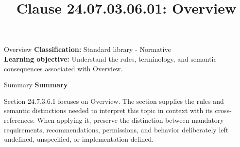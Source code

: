\documentclass[10pt,letterpaper]{article}
\title{Clause 24.07.03.06.01: Overview}
\author{}
\date{}
\begin{document}
\maketitle
\begin{CornellOverviewBox}{Overview}
\textbf{Classification:} Standard library - Normative\\[2pt]
\textbf{Learning objective:} Understand the rules, terminology, and semantic consequences associated with Overview.
\end{CornellOverviewBox}\begin{CornellSummaryBox}{Summary}
{\sffamily\bfseries\color{Accent} Summary}\par\vspace{3pt}Section 24.7.3.6.1 focuses on Overview. The section supplies the rules and semantic distinctions needed to interpret this topic in context with its cross-references. When applying it, preserve the distinction between mandatory requirements, recommendations, permissions, and behavior deliberately left undefined, unspecified, or implementation-defined.
\end{CornellSummaryBox}
\end{document}
